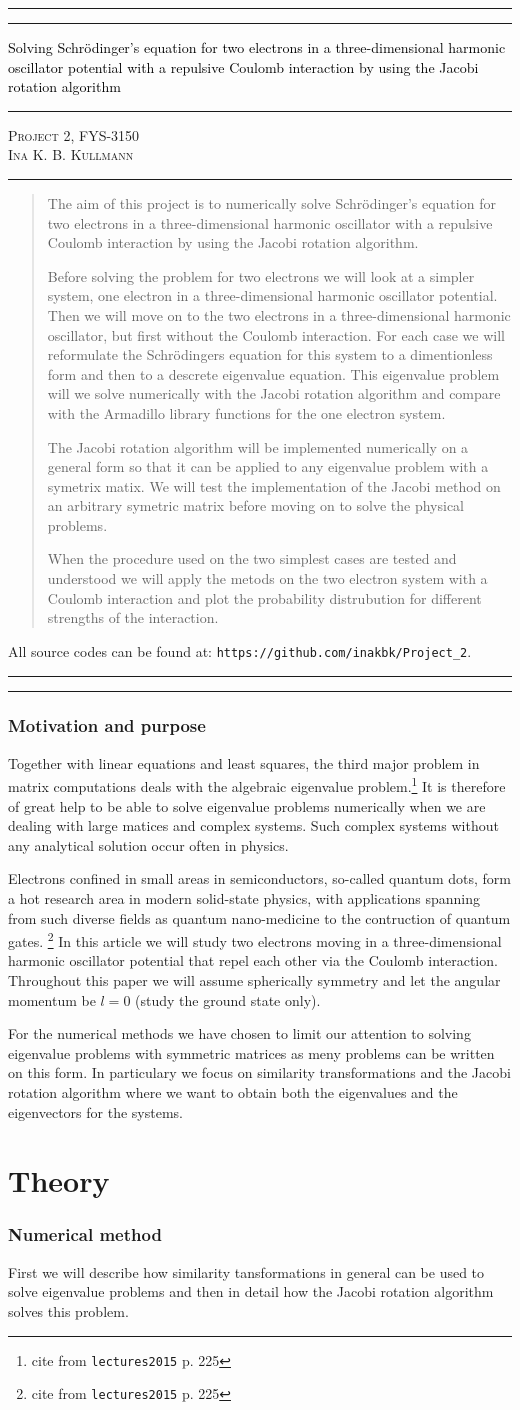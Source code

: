 \documentclass[11pt,a4wide]{article}
\newcommand*{\titleAT}{\begingroup %
\newlength{\drop} %
\drop=0.1\textheight %

\rule{\textwidth}{1pt}\par %
\vspace{2pt}\vspace{-\baselineskip} %
\rule{\textwidth}{0.4pt}\par %

\vspace{0.5\drop} %
\centering %
\textcolor{black}{ %
{\Huge Solving Schr\"odinger's equation for two electrons in a three-dimensional harmonic oscillator potential with a repulsive Coulomb interaction by using the Jacobi rotation algorithm}\\[0.75\baselineskip] %
} 

\vspace{0.25\drop} %
\rule{0.3\textwidth}{0.4pt}\par %
\vspace{0.25\drop} %

{\Large \textsc{Project 2, FYS-3150\\[0.75\baselineskip] \normalsize{Ina K. B. Kullmann}
}}\par %


\vspace{0.25\drop} %
\rule{0.3\textwidth}{0.4pt}\par %
\vspace{0.25\drop} %

\begin{abstract}
The aim of this project is to numerically solve Schr\"odinger's equation for two electrons in a three-dimensional harmonic oscillator with a repulsive Coulomb interaction by using the Jacobi rotation algorithm. 

Before solving the problem for two electrons we will look at a simpler system, one electron in a three-dimensional harmonic oscillator potential. Then we will move on to the two electrons in a three-dimensional harmonic oscillator, but first without the Coulomb interaction. For each case we will reformulate the Schr\"odingers equation for this system to a dimentionless form and then to a descrete eigenvalue equation. This eigenvalue problem will we solve numerically with the Jacobi rotation algorithm and compare with the Armadillo library functions for the one electron system. 

The Jacobi rotation algorithm will be implemented numerically on a general form so that it can be applied to any eigenvalue problem with a symetrix matix. We will test the implementation of the Jacobi method on an arbitrary symetric matrix before moving on to solve the physical problems. 

When the procedure used on the two simplest cases are tested and understood we will apply the metods on the two electron system with a Coulomb interaction and plot the probability distrubution for different strengths of the interaction. 
\end{abstract}
\vspace*{0.25\drop} %

\begin{center}
{ \scriptsize \noindent All source codes can be found at: \texttt{https://github.com/inakbk/Project\_2}. }
\end{center}

\rule{\textwidth}{0.4pt}\par %
\vspace{2pt}\vspace{-\baselineskip} %
\rule{\textwidth}{1pt}\par %

\endgroup}
\begin{document}
\titleAT %





\newpage
\tableofcontents
\newpage

\section{Motivation and purpose}
Together with linear equations and least squares, the third major problem in matrix computations deals with the algebraic eigenvalue problem.\footnote{cite from \texttt{lectures2015} p. 225} It is therefore of great help to be able to solve eigenvalue problems numerically when we are dealing with large matices and complex systems. Such complex systems without any analytical solution occur often in physics.

Electrons confined in small areas in semiconductors, so-called quantum dots, form a hot research area in modern solid-state physics, with applications spanning from such diverse fields as quantum nano-medicine to the contruction of quantum gates. \footnote{cite from \texttt{lectures2015} p. 225} In this article we will study two electrons moving in a three-dimensional harmonic oscillator potential that repel each other via the Coulomb interaction. Throughout this paper we will assume spherically symmetry and let the angular momentum be $l=0$ (study the ground state only). 
  
For the numerical methods we have chosen to limit our attention to solving eigenvalue problems with symmetric matrices as meny problems can be written on this form. In particulary we focus on similarity transformations and the Jacobi rotation algorithm where we want to obtain both the eigenvalues and the eigenvectors for the systems. 


\newpage
\part{Theory}
\section{Numerical method}

First we will describe how similarity tansformations in general can be used to solve eigenvalue problems and then in detail how the Jacobi rotation algorithm solves this problem.
\end{document}
